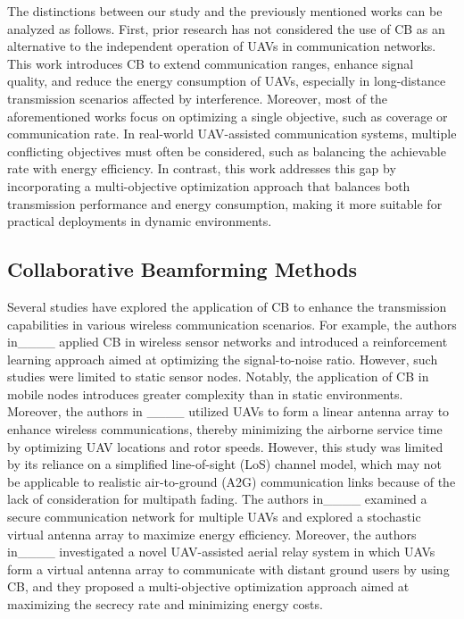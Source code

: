 \par The distinctions between our study and the previously mentioned works can be analyzed as follows. First, prior research has not considered the use of CB as an alternative to the independent operation of UAVs in communication networks. This work introduces CB to extend communication ranges, enhance signal quality, and reduce the energy consumption of UAVs, especially in long-distance transmission scenarios affected by interference. Moreover, most of the aforementioned works focus on optimizing a single objective, such as coverage or communication rate. In real-world UAV-assisted communication systems, multiple conflicting objectives must often be considered, such as balancing the achievable rate with energy efficiency. In contrast, this work addresses this gap by incorporating a multi-objective optimization approach that balances both transmission performance and energy consumption, making it more suitable for practical deployments in dynamic environments.


\subsection{Collaborative Beamforming Methods}
\label{subsec:Collaborative Beamforming}

\par Several studies have explored the application of CB to enhance the transmission capabilities in various wireless communication scenarios. For example, the authors in____ applied CB in wireless sensor networks and introduced a reinforcement learning approach aimed at optimizing the signal-to-noise ratio. However, such studies were limited to static sensor nodes. Notably, the application of CB in mobile nodes introduces greater complexity than in static environments. Moreover, the authors in  ____ utilized UAVs to form a linear antenna array to enhance wireless communications, thereby minimizing the airborne service time by optimizing UAV locations and rotor speeds. However, this study was limited by its reliance on a simplified line-of-sight (LoS) channel model, which may not be applicable to realistic air-to-ground (A2G) communication links because of the lack of consideration for multipath fading. The authors in____ examined a secure communication network for multiple UAVs and explored a stochastic virtual antenna array to maximize energy efficiency. Moreover, the authors in____ investigated a novel UAV-assisted aerial relay system in which UAVs form a virtual antenna array to communicate with distant ground users by using CB, and they proposed a multi-objective optimization approach aimed at maximizing the secrecy rate and minimizing energy costs. 

